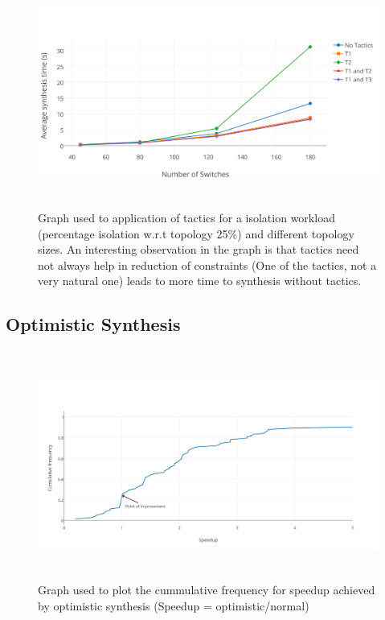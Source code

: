 \begin{figure}
	\includegraphics[height=7.5cm]{figures/isolation-tactics.png}
	\caption{Graph used to application of tactics for a isolation workload (percentage isolation w.r.t topology 25\%) and different topology sizes. An interesting observation in the graph is that tactics need not always help in reduction of constraints (One of the tactics, not  a very natural one) leads to more time to synthesis without tactics.}
	\label{fig:isolation-tactics}
\end{figure}

\subsection{Optimistic Synthesis}
\begin{figure}
	\includegraphics[height=7.5cm]{figures/opt-cdf.png}
	\caption{Graph used to plot the cummulative frequency for speedup achieved by optimistic synthesis (Speedup = optimistic/normal)}
	\label{fig:opt-cdf}
\end{figure}

